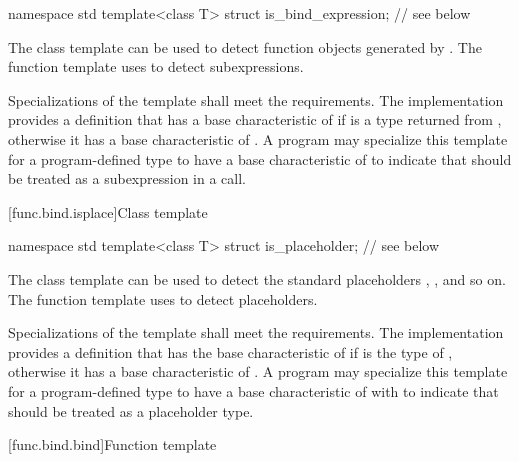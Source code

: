 %
\begin{codeblock}
namespace std {
  template<class T> struct is_bind_expression;  // see below
}
\end{codeblock}

\pnum
The class template  can be used to detect function objects
generated by . The function template 
uses  to detect subexpressions.

\pnum
Specializations of the  template shall meet
the  requirements. The implementation
provides a definition that has a base characteristic of
 if  is a type returned from ,
otherwise it has a base characteristic of .
A program may specialize this template for a program-defined type 
to have a base characteristic of  to indicate that
 should be treated as a subexpression in a  call.

[func.bind.isplace]{Class template }

%
\begin{codeblock}
namespace std {
  template<class T> struct is_placeholder;      // see below
}
\end{codeblock}

\pnum
The class template  can be used to detect the standard placeholders
, , and so on. The function template  uses
 to detect placeholders.

\pnum
Specializations of the  template shall meet
the  requirements. The implementation
provides a definition that has the base characteristic of
 if  is the type of
, otherwise it has a
base characteristic of . A program
may specialize this template for a program-defined type  to
have a base characteristic of 
with  to indicate that  should be
treated as a placeholder type.

[func.bind.bind]{Function template }

